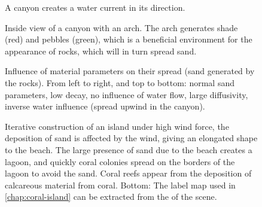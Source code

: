 \begin{figure}
    \caption{A canyon creates a water current in its direction.}
    \label{fig:env-obj-canyon-flow}
\end{figure}

\begin{figure}
    \caption{Inside view of a canyon with an arch. The arch generates shade (red) and pebbles (green), which is a beneficial environment for the appearance of rocks, which will in turn spread sand.}
    \label{fig:env-obj-canyon-inside-with-arch}
\end{figure}

\begin{figure}
    \caption{Influence of material parameters on their spread (sand generated by the rocks). From left to right, and top to bottom: normal sand parameters, low decay, no influence of water flow, large diffusivity, inverse water influence (spread upwind in the canyon).}
    \label{fig:env-obj-material-diffusion-parameters}
\end{figure}

\begin{figure}
    \caption{Iterative construction of an island under high wind force, the deposition of sand is affected by the wind, giving an elongated shape to the beach. The large presence of sand due to the beach creates a lagoon, and quickly coral colonies spread on the borders of the lagoon to avoid the sand. Coral reefs appear from the deposition of calcareous material from coral. Bottom: The label map used in \cref{chap:coral-island} can be extracted from the  of the scene.}
    \label{fig:env-obj-iterative-island}
\end{figure}

